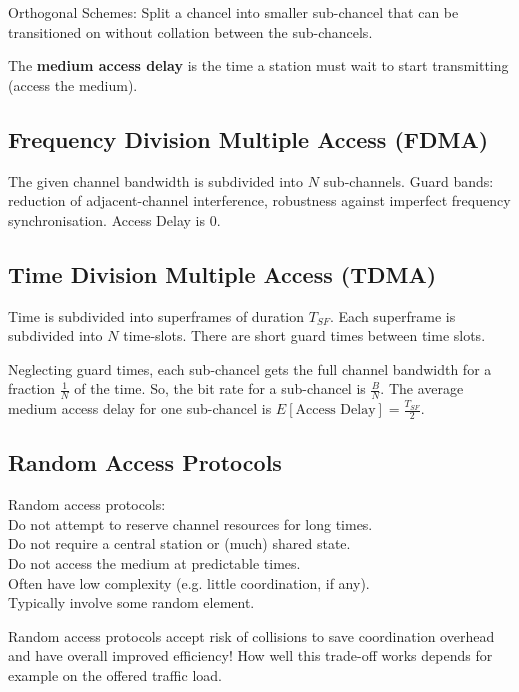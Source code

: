 \documentclass[a4paper,11pt,twocolumn]{article}
\begin{document}
Orthogonal Schemes: Split a chancel into smaller sub-chancel that can be transitioned on without collation between the sub-chancels.

The \textbf{medium access delay} is the time a station must wait to start transmitting (access the medium).

\subsection*{Frequency Division Multiple Access (FDMA)}

The given channel bandwidth is subdivided into $N$ sub-channels. Guard bands: reduction of adjacent-channel interference, robustness against imperfect frequency synchronisation. Access Delay is 0.


\subsection*{Time Division Multiple Access (TDMA)}

Time is subdivided into superframes of duration $T_{SF}$.
Each superframe is subdivided into $N$ time-slots.
There are short guard times between time slots.

Neglecting guard times, each sub-chancel gets the full channel bandwidth for a fraction $\frac1N$ of the time. So, the bit rate for a sub-chancel is $\frac BN$. The average medium access delay for one sub-chancel is $E\left[\text{Access Delay}\right]=\frac{T_{SF}}{2}$.

\subsection*{Random Access Protocols}

Random access protocols: \\
Do not attempt to reserve channel resources for long times. \\
Do not require a central station or (much) shared state. \\
Do not access the medium at predictable times. \\
Often have low complexity (e.g. little coordination, if any). \\
Typically involve some random element.

Random access protocols accept risk of collisions to save coordination
overhead and have overall improved efficiency! How well this trade-off
works depends for example on the offered traffic load.
\end{document}
